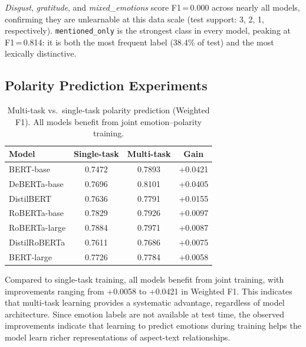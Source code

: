 \documentclass[10pt]{article}
\begin{document}
\emph{Disgust}, \emph{gratitude}, and \emph{mixed\_emotions} score F1\,=\,0.000 across nearly all models, confirming they are unlearnable at this data scale (test support: 3, 2, 1, respectively). \texttt{mentioned\_only} is the strongest class in every model, peaking at F1\,=\,0.814: it is both the most frequent label (38.4\% of test) and the most lexically distinctive.

\subsection{Polarity Prediction Experiments}

\begin{table}[H]
\centering
\caption{Multi-task vs.\ single-task polarity prediction (Weighted F1). All models benefit from joint emotion--polarity training.}
\small
\setlength{\tabcolsep}{10pt}
\begin{tabular}{lccc}
\toprule
\rowcolor{primary!90!black}
\color{white}\textbf{Model} & \color{white}\textbf{Single-task} & \color{white}\textbf{Multi-task} & \color{white}\textbf{Gain} \\
\midrule
BERT-base & 0.7472 & 0.7893 & \textcolor{positive}{+0.0421} \\
DeBERTa-base & 0.7696 & 0.8101 & \textcolor{positive}{+0.0405} \\
DistilBERT & 0.7636 & 0.7791 & \textcolor{positive}{+0.0155} \\
RoBERTa-base & 0.7829 & 0.7926 & \textcolor{positive}{+0.0097} \\
RoBERTa-large & 0.7884 & 0.7971 & \textcolor{positive}{+0.0087} \\
DistilRoBERTa & 0.7611 & 0.7686 & \textcolor{positive}{+0.0075} \\
BERT-large & 0.7726 & 0.7784 & \textcolor{positive}{+0.0058} \\
\bottomrule
\end{tabular}
\end{table}

Compared to single-task training, all models benefit from joint training, with improvements ranging from +0.0058 to +0.0421 in Weighted F1. This indicates that multi-task learning provides a systematic advantage, regardless of model architecture. Since emotion labels are not available at test time, the observed improvements indicate that learning to predict emotions during training helps the model learn richer representations of aspect-text relationships.
\end{document}
